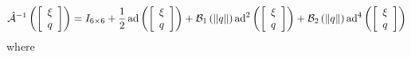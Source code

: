 %
%
\begin{equation}\label{appenJacSE3.eq.hatAinv}
  \hat{\mathcal{A}}^{-1}\left(\left[ \begin{array}{c} 
        \xi \\ q  \\
\end{array} \right]\right)=
    I_{6\times 6}+\frac{1}{2}\operatorname{ad}\left(\left[ \begin{array}{c} 
\xi \\ q  \\
\end{array} \right]\right)
+\mathcal{B}_1\left(\|q\|\right)\operatorname{ad}^2\left(\left[ \begin{array}{c} 
\xi \\ q  \\
\end{array} \right]\right)+\mathcal{B}_2\left(\|q\|\right)\operatorname{ad}^4\left(\left[ \begin{array}{c} 
\xi \\ q  \\
\end{array} \right]\right)
\end{equation}
%
where 
